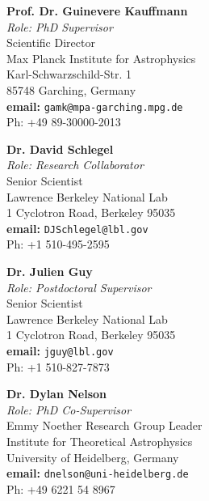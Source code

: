 \item
\begin{minipage}[t]{0.48\textwidth}
\textbf{Prof. Dr. Guinevere Kauffmann} \\
\textit{Role: PhD Supervisor} \\
Scientific Director \\
Max Planck Institute for Astrophysics \\
Karl-Schwarzschild-Str. 1\\
85748 Garching, Germany\\
\textbf{email: }\texttt{gamk@mpa-garching.mpg.de} \\
Ph: +49 89-30000-2013
\end{minipage}
\hfill
\begin{minipage}[t]{0.48\textwidth}
\textbf{Dr. David Schlegel} \\
\textit{Role: Research Collaborator} \\
Senior Scientist \\
Lawrence Berkeley National Lab \\
1 Cyclotron Road, Berkeley 95035 \\
\textbf{email: }\texttt{DJSchlegel@lbl.gov} \\
Ph: +1 510-495-2595
\end{minipage}
\vspace{1.5cm}

\item
\begin{minipage}[t]{0.48\textwidth}
\textbf{Dr. Julien Guy} \\
\textit{Role: Postdoctoral Supervisor} \\
Senior Scientist \\
Lawrence Berkeley National Lab \\
1 Cyclotron Road, Berkeley 95035 \\
\textbf{email: }\texttt{jguy@lbl.gov} \\
Ph: +1 510-827-7873
\end{minipage}
\hfill
\begin{minipage}[t]{0.48\textwidth}
\textbf{Dr. Dylan Nelson} \\
\textit{Role: PhD Co-Supervisor} \\
Emmy Noether Research Group Leader \\
Institute for Theoretical Astrophysics \\
University of Heidelberg, Germany \\
\textbf{email: }\texttt{dnelson@uni-heidelberg.de} \\
Ph: +49 6221 54 8967
\end{minipage}
\vspace{1.5cm}

